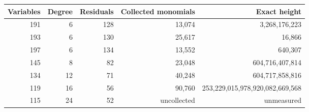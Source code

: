 \begin{center}\small
\begin{tabular}{rrrrr}
\toprule
Variables&Degree&Residuals&Collected monomials&Exact height\\\midrule
191&6&128&13,074&3,268,176,223\\
193&6&130&25,617&16,866\\
197&6&134&13,552&640,307\\
145&8&82&23,048&604,716,407,814\\
134&12&71&40,248&604,717,858,816\\
119&16&56&90,760&253,229,015,978,920,082,669,568\\
115&24&52&uncollected&unmeasured\\
\bottomrule\end{tabular}\end{center}
